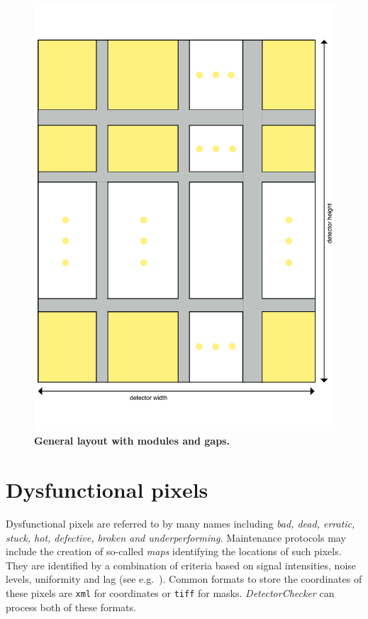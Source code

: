 \documentclass[11pt,a4paper,twosided]{article}
\newcommand{\DetectorChecker}{\emph{DetectorChecker}\xspace}
\begin{document}
\begin{figure}[htbp]
\begin{center}
\includegraphics[width=16cm]{layoutDrawingDC.pdf}
\caption
{
{\bfseries 
General layout with modules and gaps.}
}
\label{fig_layout}
\end{center}
\end{figure}



\section{Dysfunctional pixels}\label{dysfct}

Dysfunctional pixels are referred to by many names including {\it bad, dead, erratic, stuck, hot, defective, 
broken and underperforming.} 
Maintenance protocols may include the creation of so-called {\it maps} identifying the locations of such pixels.
They are identified by a combination of criteria based on signal intensities, noise levels, uniformity and lag
(see e.g.~\cite{manualXRD1621}). 
Common formats to store the coordinates of these pixels are \texttt{xml} for coordinates or \texttt{tiff} for masks. 
\DetectorChecker can process both of these formats.
\end{document}

